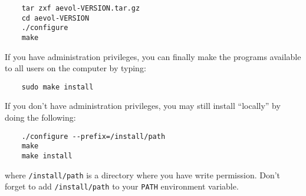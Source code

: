 \begin{verbatim}
	tar zxf aevol-VERSION.tar.gz
	cd aevol-VERSION
	./configure
	make
\end{verbatim}

If you have administration privileges, you can finally make the \aevol{} programs available to all users on the computer by typing:
\begin{verbatim}
	sudo make install
\end{verbatim}

If you don't have administration privileges, you may still install \aevol{} ``locally'' by doing the following: 
\begin{verbatim}
	./configure --prefix=/install/path
	make
	make install
\end{verbatim}
where \verb?/install/path? is a directory where you have write permission. Don't forget to add \verb?/install/path? to your \verb?PATH? environment variable.


\clearemptydoublepage






